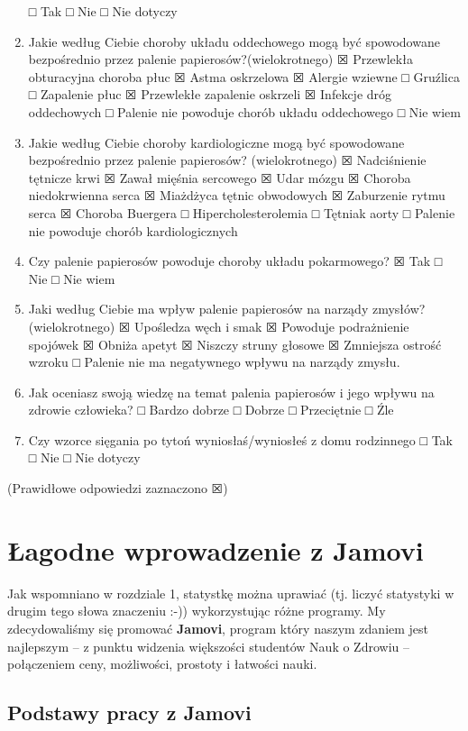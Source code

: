 \documentclass[
  openany]{book}
\begin{document}
\begin{enumerate}
  □ Tak
  □ Nie
  □ Nie dotyczy
\item
  Jakie według Ciebie choroby układu oddechowego mogą być spowodowane
  bezpośrednio przez palenie papierosów?(wielokrotnego)
  ☒ Przewlekła obturacyjna choroba płuc
  ☒ Astma oskrzelowa
  ☒ Alergie wziewne
  □ Gruźlica
  □ Zapalenie płuc
  ☒ Przewlekłe zapalenie oskrzeli
  ☒ Infekcje dróg oddechowych
  □ Palenie nie powoduje chorób układu oddechowego
  □ Nie wiem
\item
  Jakie według Ciebie choroby kardiologiczne mogą być spowodowane
  bezpośrednio przez palenie papierosów? (wielokrotnego)
  ☒ Nadciśnienie tętnicze krwi
  ☒ Zawał mięśnia sercowego
  ☒ Udar mózgu
  ☒ Choroba niedokrwienna serca
  ☒ Miażdżyca tętnic obwodowych
  ☒ Zaburzenie rytmu serca
  ☒ Choroba Buergera
  □ Hipercholesterolemia
  □ Tętniak aorty
  □ Palenie nie powoduje chorób kardiologicznych
\item
  Czy palenie papierosów powoduje choroby układu pokarmowego?
  ☒ Tak
  □ Nie
  □ Nie wiem
\item
  Jaki według Ciebie ma wpływ palenie papierosów na narządy zmysłów? (wielokrotnego)
  ☒ Upośledza węch i smak
  ☒ Powoduje podrażnienie spojówek
  ☒ Obniża apetyt
  ☒ Niszczy struny głosowe
  ☒ Zmniejsza ostrość wzroku
  □ Palenie nie ma negatywnego wpływu na narządy zmysłu.
\item
  Jak oceniasz swoją wiedzę na temat palenia papierosów i jego wpływu na zdrowie człowieka?
  □ Bardzo dobrze
  □ Dobrze
  □ Przeciętnie
  □ Źle
\item
  Czy wzorce sięgania po tytoń wyniosłaś/wyniosłeś z domu rodzinnego
  □ Tak
  □ Nie
  □ Nie dotyczy
\end{enumerate}

(Prawidłowe odpowiedzi zaznaczono ☒)

\hypertarget{intro2jamovi}{%
\chapter{Łagodne wprowadzenie z Jamovi}\label{intro2jamovi}}

Jak wspomniano w rozdziale 1, statystkę można uprawiać (tj. liczyć statystyki w drugim tego słowa znaczeniu :-))
wykorzystując różne programy. My zdecydowaliśmy się promować \textbf{Jamovi}, program
który naszym zdaniem jest najlepszym -- z punktu widzenia większości
studentów Nauk o Zdrowiu -- połączeniem ceny, możliwości, prostoty i łatwości nauki.

\hypertarget{podstawy-pracy-z-jamovi}{%
\section{Podstawy pracy z Jamovi}\label{podstawy-pracy-z-jamovi}}
\end{document}
